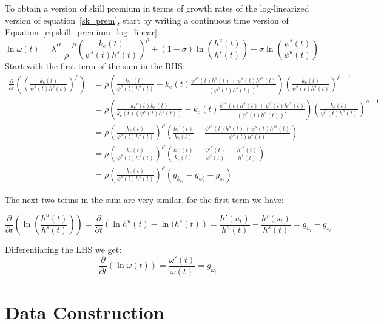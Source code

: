 \documentclass[12pt]{article}
\begin{document}
To obtain a version of skill premium in terms of growth rates of the log-linearized version of equation~\eqref{sk_prem}, start by writing a continuous time version of Equation~\eqref{eq:skill_premium_log_linear}:
\begin{equation}\label{eq:skill_premium_log_linear_continuous}
 \ln{\omega(t)} = \lambda \frac{\sigma-\rho}{\rho}\left(\frac{k_{e}(t)}{\psi^s(t) h^s(t) }\right)^\rho + (1-\sigma)\ln{\left(\frac{h^u(t)}{h^s(t)}\right)} + \sigma\ln{\left(\frac{\psi^s(t)}{\psi^u(t)}\right)}
\end{equation}
Start with the first term of the sum in the RHS:
\begin{align*}
 \frac{\partial}{\partial t}\left(\left(\frac{k_{e}(t)}{\psi^s(t)h^s(t) }\right)^\rho\right) 
 &= \rho\left( \frac{ k_e'(t)}{\psi^s(t)h^s(t)} - k_e(t) \frac{\psi'^s(t)h^s(t) + \psi^s(t) h'^s(t)}{(\psi^s(t)h^s(t))^2} \right)\left(\frac{k_{e}(t)}{\psi^s(t)h^s(t) }\right)^{\rho-1} \\
 &= \rho\left( \frac{ k_e'(t) k_e(t)}{k_e(t)(\psi^s(t)h^s(t))} - k_e(t) \frac{\psi'^s(t)h^s(t) + \psi^s(t) h'^s(t)}{(\psi^s(t)h^s(t))^2} \right)\left(\frac{k_{e}(t)}{\psi^s(t)h^s(t) }\right)^{\rho-1}\\
 &= \rho\left(\frac{k_e(t)}{\psi^s(t)h^s(t)}\right)^{\rho} \left( \frac{ k_e'(t) }{k_e(t)} - \frac{\psi'^s(t)h^s(t) + \psi^s(t) h'^s(t)}{\psi^s(t)h^s(t)} \right)\\
 &= \rho\left(\frac{k_e(t)}{\psi^s(t)h^s(t)}\right)^{\rho} \left( \frac{ k_e'(t) }{k_e(t)} - \frac{\psi'^s(t)}{\psi^s(t)} - \frac{ h'^s(t)}{h^s(t)} \right)\\
 &= \rho\left(\frac{k_e(t)}{\psi^s(t)h^s(t)}\right)^{\rho}(g_{k_{e_{t}}} - g_{\psi^s_t} - g_{s_t})
\end{align*}

The next two terms in the sum are very similar, for the first term we have:

\begin{equation}
 \frac{\partial}{\partial t} \left( \ln{\left( \frac{h^u(t) }{h^s(t)} \right)} \right) = \frac{\partial}{\partial t} \left( \ln{h^u(t)} - \ln{(h^s(t)} \right) = \frac{h'(u_t)}{h^u(t)} - \frac{h'(s_t)}{h^s(t)} = g_{u_t} - g_{s_t}
\end{equation}
 
Differentiating the LHS we get:
$$\frac{\partial}{\partial t}\left(\ln{\omega(t)}\right) = \frac{\omega'(t)}{\omega(t)} = g_{\omega_t}$$


\section{Data Construction}\label{sec:data-construction}
\end{document}
